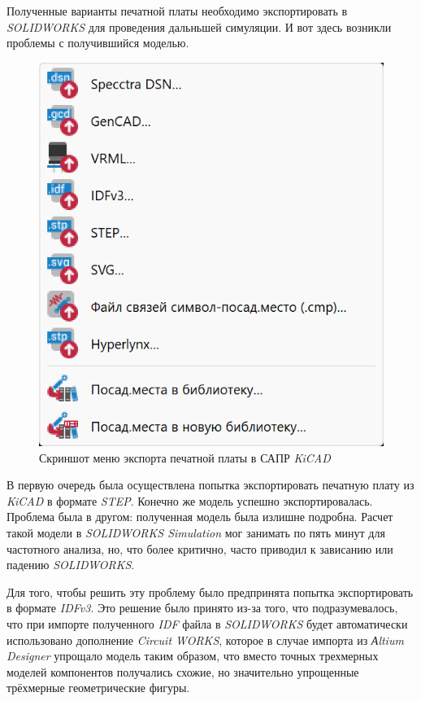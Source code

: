 Полученные варианты печатной платы необходимо экспортировать в \textit{SOLIDWORKS} для проведения дальньшей симуляции. И вот здесь возникли проблемы с получившийся моделью.

\begin{figure}[H]
  \centering
  \includegraphics[scale = 0.4]{../img/scrot/Screenshot-2024-05-06-191242.png}
  \caption{Скриншот меню экспорта печатной платы в САПР \textit{KiCAD} }
\end{figure}

В первую очередь была осуществлена попытка экспортировать печатную плату из \textit{KiCAD} в формате \textit{STEP}. Конечно же модель успешно экспортировалась. Проблема была в другом: полученная модель была излишне подробна. Расчет такой модели в \textit{SOLIDWORKS Simulation} мог занимать по пять минут для частотного анализа, но, что более критично, часто приводил к зависанию или падению \textit{SOLIDWORKS}.

Для того, чтобы решить эту проблему было предпринята попытка экспортировать в формате \textit{IDFv3}. Это решение было принято из-за того, что подразумевалось,
что при импорте полученного \textit{IDF} файла в \textit{SOLIDWORKS} будет автоматически использовано дополнение \textit{Circuit WORKS}, которое в случае импорта из \textit{Аltium Designer} упрощало модель таким образом, что вместо точных трехмерных моделей компонентов получались схожие, но значительно упрощенные трёхмерные геометрические фигуры.


